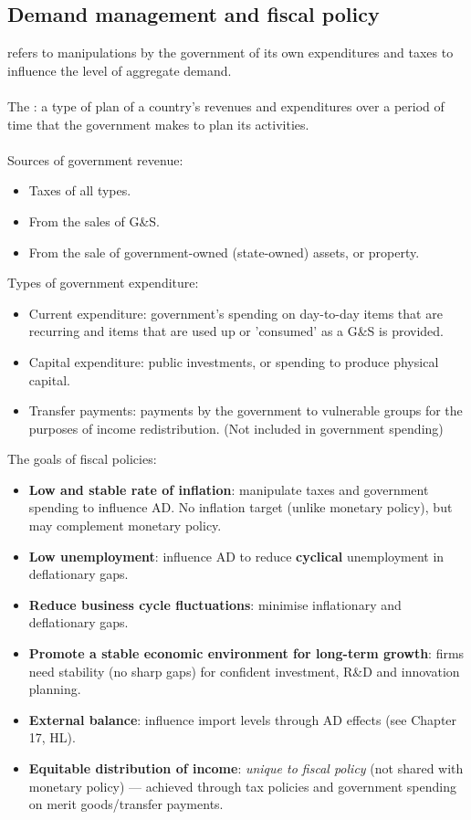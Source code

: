 \subsection{Demand management and fiscal policy}
 refers to manipulations by the government of its own expenditures and taxes to influence the level of aggregate demand.\\\\
The : a type of plan of a country's revenues and expenditures over a period of time that the government makes to plan its activities.\\\\
Sources of government revenue:
\begin{itemize}
  \item Taxes of all types.
  \item From the sales of G\&S.
  \item From the sale of government-owned (state-owned) assets, or property.
\end{itemize}
Types of government expenditure:
\begin{itemize}
  \item Current expenditure: government's spending on day-to-day items that are recurring and items that are used up or 'consumed' as a G\&S is provided. 
  \item Capital expenditure: public investments, or spending to produce physical capital.
  \item Transfer payments:  payments by the government to vulnerable groups for the purposes of income redistribution. (Not included in government spending)
\end{itemize}
The goals of fiscal policies:
\begin{itemize}
  \item \textbf{Low and stable rate of inflation}: manipulate taxes and government spending to influence AD. No inflation target (unlike monetary policy), but may complement monetary policy.
  \item \textbf{Low unemployment}: influence AD to reduce \textbf{cyclical} unemployment in deflationary gaps.
  \item \textbf{Reduce business cycle fluctuations}: minimise inflationary and deflationary gaps.
  \item \textbf{Promote a stable economic environment for long-term growth}: firms need stability (no sharp gaps) for confident investment, R\&D and innovation planning.
  \item \textbf{External balance}: influence import levels through AD effects (see Chapter 17, HL).
  \item \textbf{Equitable distribution of income}: \textit{unique to fiscal policy} (not shared with monetary policy) --- achieved through tax policies and government spending on merit goods/transfer payments.
\end{itemize}
